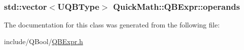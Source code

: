 \subsubsection[{operands}]{\setlength{\rightskip}{0pt plus 5cm}std\+::vector$<${\bf U\+Q\+B\+Type}$>$ Quick\+Math\+::\+Q\+B\+Expr\+::operands\hspace{0.3cm}{\ttfamily [protected]}}\label{classQuickMath_1_1QBExpr_ad3cff7ae0f5496d8e09990a66a395237}


The documentation for this class was generated from the following file\+:\begin{DoxyCompactItemize}
\item 
include/\+Q\+Bool/\hyperlink{QBExpr_8h}{Q\+B\+Expr.\+h}\end{DoxyCompactItemize}
